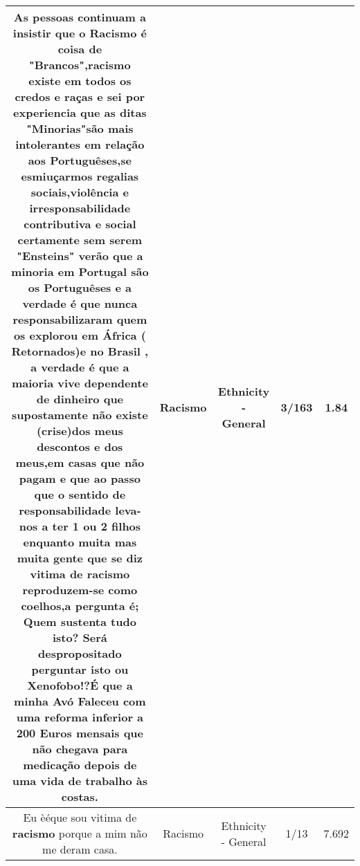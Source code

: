\documentclass[11pt]{article}
\newlength\mylength
\begin{document}
\begin{center}
\begin{longtable}{|C{.65\mylength}|C{.30\mylength}|C{.12\mylength}|C{.12\mylength}|C{.12\mylength}|}
  \small As pessoas continuam a insistir que o \textbf{Racismo} é coisa de "Brancos",\textbf{racismo} existe em todos os credos e raças e sei por experiencia que as ditas "Minorias"são mais intolerantes em relação aos Portuguêses,se esmiuçarmos regalias sociais,violência e irresponsabilidade contributiva e social certamente sem serem "Ensteins" verão que a minoria em Portugal são os Portuguêses e a verdade é que nunca responsabilizaram quem os explorou em África ( Retornados)e no Brasil , a verdade é que a maioria vive dependente de dinheiro que supostamente não existe (crise)dos meus descontos e dos meus,em casas que não pagam e que ao passo que o sentido de responsabilidade leva-nos a ter 1 ou 2 filhos enquanto muita mas muita gente que se diz vitima de \textbf{racismo} reproduzem-se como coelhos,a pergunta é; Quem sustenta tudo isto? Será despropositado perguntar isto ou Xenofobo!?É que a minha Avó Faleceu com uma reforma inferior a 200 Euros mensais que não chegava para medicação depois de uma vida de trabalho às costas.\normalsize   & Racismo & Ethnicity - General & 3/163 & 1.84 \\  \hline
  \small Eu èéque sou vitima de \textbf{racismo} porque a mim não me deram casa.\normalsize   & Racismo & Ethnicity - General & 1/13 & 7.692 \\  \hline

\end{longtable}
\end{center}
\end{document}

